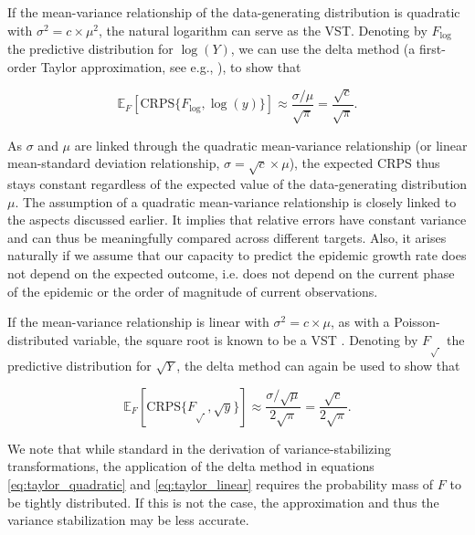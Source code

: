 \documentclass[10pt,letterpaper]{article}
\begin{document}
If the mean-variance relationship of the data-generating distribution is quadratic with $\sigma^2 = c \times \mu^2$, the natural logarithm can serve as the VST. Denoting by $F_{\log}$ the predictive distribution for $\log(Y)$, we can use the delta method (a first-order Taylor approximation, see e.g., \cite{dunnGeneralizedLinearModels2018}), to show that

\begin{linenomath*}
\begin{equation}
\mathbb{E}_F[\text{CRPS}\{F_{\log}, \log(y)\}] \approx \frac{\sigma/\mu}{\sqrt{\pi}} 
= \frac{\sqrt{c}}{\sqrt{\pi}}
.\label{eq:taylor_quadratic}
\end{equation}
\end{linenomath*}
As $\sigma$ and $\mu$ are linked through the quadratic mean-variance relationship (or linear mean-standard deviation relationship, $\sigma = \sqrt{c} \times \mu$), the expected CRPS thus stays constant regardless of the expected value of the data-generating distribution $\mu$. The assumption of a quadratic mean-variance relationship is closely linked to the aspects discussed earlier. It implies that relative errors have constant variance and can thus be meaningfully compared across different targets. Also, it arises naturally if we assume that our capacity to predict the epidemic growth rate does not depend on the expected outcome, i.e. does not depend on the current phase of the epidemic or the order of magnitude of current observations.

If the mean-variance relationship is linear with $\sigma^2 = c \times \mu$, as with a Poisson-distributed variable, the square root is known to be a VST \cite{dunnGeneralizedLinearModels2018}. 
Denoting by $F_{\sqrt{\ }}$ the predictive distribution for $\sqrt{Y}$, the delta method can again be used to show that
\begin{linenomath*}
\begin{equation}
\mathbb{E}_F[\text{CRPS}\{F_{\sqrt{\ }}, \sqrt{y}\}] \approx \frac{\sigma/\sqrt{\mu}}{2\sqrt{\pi}} = \frac{\sqrt{c}}{2\sqrt{\pi}}
.\label{eq:taylor_linear}
\end{equation}
\end{linenomath*}
We note that while standard in the derivation of variance-stabilizing transformations, the application of the delta method in equations \eqref{eq:taylor_quadratic} and \eqref{eq:taylor_linear} requires the probability mass of $F$ to be tightly distributed. If this is not the case, the approximation and thus the variance stabilization may be less accurate.
\end{document}
